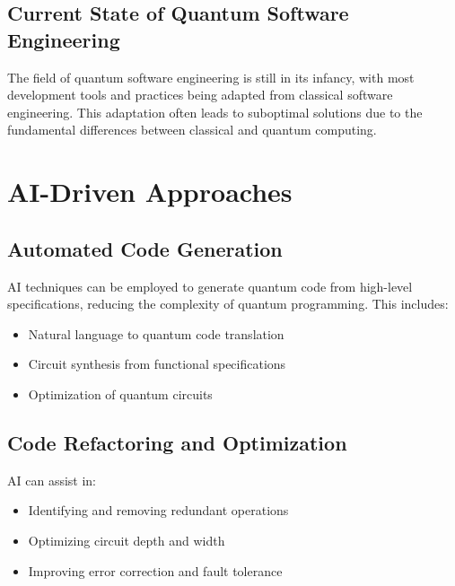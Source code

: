 \documentclass[10pt,twocolumn]{article}
\begin{document}
\subsection{Current State of Quantum Software Engineering}
The field of quantum software engineering is still in its infancy, with most development tools and practices being adapted from classical software engineering. This adaptation often leads to suboptimal solutions due to the fundamental differences between classical and quantum computing.

\section{AI-Driven Approaches}
\subsection{Automated Code Generation}
AI techniques can be employed to generate quantum code from high-level specifications, reducing the complexity of quantum programming. This includes:
\begin{itemize}[leftmargin=*]
    \item Natural language to quantum code translation
    \item Circuit synthesis from functional specifications
    \item Optimization of quantum circuits
\end{itemize}

\subsection{Code Refactoring and Optimization}
AI can assist in:
\begin{itemize}[leftmargin=*]
    \item Identifying and removing redundant operations
    \item Optimizing circuit depth and width
    \item Improving error correction and fault tolerance
\end{itemize}
\end{document}
